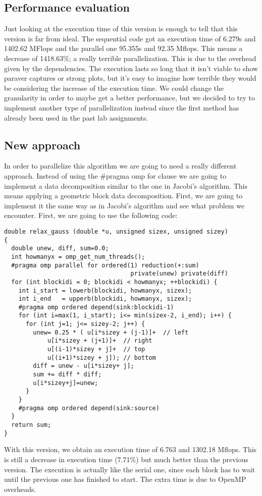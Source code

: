 \subsection{Performance evaluation}
\justify
Just looking at the execution time of this version is enough to tell that this version is far from ideal. The sequential code got an execution time of 6.279s and 1402.62 MFlop\/s and the parallel one 95.355s and 92.35 Mflop\/s. This means a decrease of 1418.63\%; a really terrible parallelization. This is due to the overhead given by the dependencies. 
\justify
The execution lasts so long that it isn't viable to show paraver captures or strong plots, but it's easy to imagine how terrible they would be considering the increase of the execution time. We could change the granularity in order to maybe get a better performance, but we decided to try to implement another type of parallelization instead since the first method has already been used in the past lab assignments.

\subsection{New approach}
\justify
In order to parallelize this algorithm we are going to need a really different approach. Instead of using the \#pragma omp for clause we are going to implement a data decomposition similar to the one in Jacobi's algorithm. This means applying a geometric block data decomposition. First, we are going to implement it the same way as in Jacobi's algorithm and see what problem we encounter.
\justify
First, we are going to use the following code:
\begin{lstlisting}
double relax_gauss (double *u, unsigned sizex, unsigned sizey)
{
  double unew, diff, sum=0.0;
  int howmanyx = omp_get_num_threads();
  #pragma omp parallel for ordered(1) reduction(+:sum)  
                                   private(unew) private(diff)
  for (int blockidi = 0; blockidi < howmanyx; ++blockidi) {
    int i_start = lowerb(blockidi, howmanyx, sizex);
    int i_end   = upperb(blockidi, howmanyx, sizex);
    #pragma omp ordered depend(sink:blockidi-1)
    for (int i=max(1, i_start); i<= min(sizex-2, i_end); i++) {
      for (int j=1; j<= sizey-2; j++) {
        unew= 0.25 * ( u[i*sizey + (j-1)]+  // left
			u[i*sizey + (j+1)]+  // right
			u[(i-1)*sizey + j]+  // top
			u[(i+1)*sizey + j]); // bottom
        diff = unew - u[i*sizey+ j];
        sum += diff * diff; 
        u[i*sizey+j]=unew;
      } 
    }
    #pragma omp ordered depend(sink:source)
  }
  return sum;
}
\end{lstlisting}
\justify
With this version, we obtain an execution time of 6.763 and 1302.18 Mflop\/s. This is still a decrease in execution time (7.71\%) but much better than the previous version. The execution is actually like the serial one, since each block has to wait until the previous one has finished to start. The extra time is due to OpenMP overheads.

